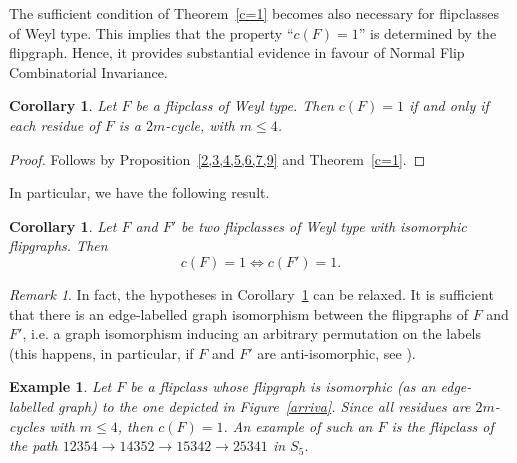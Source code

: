 \documentclass[12pt,reqno]{amsart}
\theoremstyle{plain}
\newtheorem{cor}[thm]{Corollary}
\newtheorem{exa}[thm]{Example}
\theoremstyle{definition}
\theoremstyle{remark}
\newtheorem{rmk}[thm]{Remark}
\begin{document}
The sufficient condition of Theorem~\ref{c=1} becomes also necessary for flipclasses of Weyl type. This implies that  the property ``$c(F)=1$'' is determined by the flipgraph. Hence, it provides substantial evidence in favour of Normal Flip Combinatorial Invariance. 
\begin{cor}
Let $F$ be a flipclass of Weyl type. Then  $c(F)=1$ if and only if each residue of $F$ is a $2m$-cycle, with $m\leq 4$.
\end{cor}
\begin{proof}
Follows by Proposition~\ref{2,3,4,5,6,7,9} and Theorem~\ref{c=1}.
\end{proof}
In particular, we have the following result.
\begin{cor}\label{tardi}
Let $F$ and $F'$ be two flipclasses of Weyl type with isomorphic flipgraphs. Then 
$$c(F)=1 \iff c(F')=1.$$
\end{cor}


\begin{rmk}
In fact, the hypotheses in Corollary~\ref{tardi} can be relaxed. It is sufficient that there is an edge-labelled graph isomorphism between the flipgraphs of $F$ and $F'$, i.e. a graph isomorphism inducing an arbitrary permutation on the labels (this happens, in particular, if $F$ and $F'$ are anti-isomorphic, see \cite[Definition~3.8]{EMS}).
\end{rmk}

\begin{exa}
Let $F$ be a flipclass whose flipgraph is isomorphic (as an edge-labelled graph) to the one depicted in Figure~\ref{arriva}. Since all residues are $2m$-cycles with $m \leq 4$, then $c(F) = 1$. An example of such an $F$ is the flipclass of the path 
$ 12354 \longrightarrow 14352 \longrightarrow 15342 \longrightarrow 25341$ in $S_5$.
\end{exa}
\end{document}
